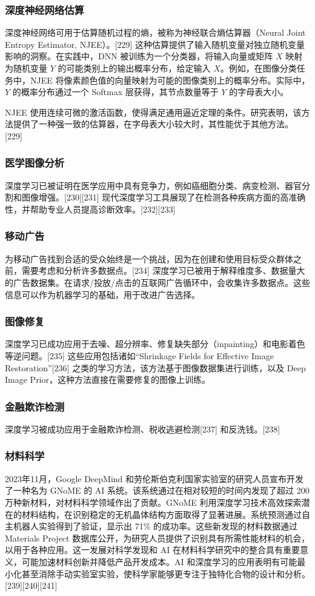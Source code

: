 \subsubsection{深度神经网络估算}  
深度神经网络可用于估算随机过程的熵，被称为神经联合熵估算器（Neural Joint Entropy Estimator, NJEE）。[229] 这种估算提供了输入随机变量对独立随机变量影响的洞察。在实践中，DNN 被训练为一个分类器，将输入向量或矩阵 \(X\) 映射为随机变量 \(Y\) 的可能类别上的输出概率分布，给定输入 \(X\)。例如，在图像分类任务中，NJEE 将像素颜色值的向量映射为可能的图像类别上的概率分布。实际中，\(Y\) 的概率分布通过一个 Softmax 层获得，其节点数量等于 \(Y\) 的字母表大小。  

NJEE 使用连续可微的激活函数，使得满足通用逼近定理的条件。研究表明，该方法提供了一种强一致的估算器，在字母表大小较大时，其性能优于其他方法。[229]  
\subsubsection{医学图像分析}  
深度学习已被证明在医学应用中具有竞争力，例如癌细胞分类、病变检测、器官分割和图像增强。[230][231] 现代深度学习工具展现了在检测各种疾病方面的高准确性，并帮助专业人员提高诊断效率。[232][233]  
\subsubsection{移动广告}  
为移动广告找到合适的受众始终是一个挑战，因为在创建和使用目标受众群体之前，需要考虑和分析许多数据点。[234] 深度学习已被用于解释维度多、数据量大的广告数据集。在请求/投放/点击的互联网广告循环中，会收集许多数据点。这些信息可以作为机器学习的基础，用于改进广告选择。  
\subsubsection{图像修复}  
深度学习已成功应用于去噪、超分辨率、修复缺失部分（inpainting）和电影着色等逆问题。[235] 这些应用包括诸如“Shrinkage Fields for Effective Image Restoration”[236] 之类的学习方法，该方法基于图像数据集进行训练，以及 Deep Image Prior，这种方法直接在需要修复的图像上训练。  
\subsubsection{金融欺诈检测 } 
深度学习被成功应用于金融欺诈检测、税收逃避检测[237] 和反洗钱。[238]  
\subsubsection{材料科学}  
2023年11月，Google DeepMind 和劳伦斯伯克利国家实验室的研究人员宣布开发了一种名为 GNoME 的 AI 系统。该系统通过在相对较短的时间内发现了超过 200 万种新材料，对材料科学领域作出了贡献。GNoME 利用深度学习技术高效探索潜在的材料结构，在识别稳定的无机晶体结构方面取得了显著进展。系统预测通过自主机器人实验得到了验证，显示出 71\% 的成功率。这些新发现的材料数据通过 Materials Project 数据库公开，为研究人员提供了识别具有所需性能材料的机会，以用于各种应用。这一发展对科学发现和 AI 在材料科学研究中的整合具有重要意义，可能加速材料创新并降低产品开发成本。AI 和深度学习的应用表明有可能最小化甚至消除手动实验室实验，使科学家能够更专注于独特化合物的设计和分析。[239][240][241]  
